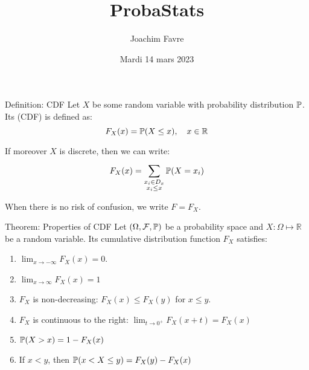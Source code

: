 \documentclass[a4paper]{article}
\title{ProbaStats}
\author{Joachim Favre}
\date{Mardi 14 mars 2023}
\begin{document}
\maketitle


\begin{parag}{Definition: CDF}
    Let $X$ be some random variable with probability distribution $\mathbb{P}$. Its  (CDF) is defined as: 
    \[F_X\left(x\right) = \prob\left(X \leq x\right), \mathspace x \in \mathbb{R}\]
    
    If moreover $X$ is discrete, then we can write: 
    \[F_X\left(x\right) = \sum_{\substack{x_i \in D_x \\ x_i \leq x}}^{} \prob\left(X = x_i\right)\]
    
    When there is no risk of confusion, we write $F = F_X$.
\end{parag}

\begin{parag}{Theorem: Properties of CDF}
    Let $\left(\Omega, \mathcal{F}, \prob\right)$ be a probability space and $X: \Omega \mapsto \mathbb{R}$ be a random variable. Its cumulative distribution function $F_X$ satisfies:
    \begin{enumerate}
        \item $\lim_{x \to -\infty} F_X\left(x\right) = 0$.
        \item $\lim_{x \to \infty} F_X\left(x\right) = 1$
        \item $F_X$ is non-decreasing: $F_X\left(x\right) \leq F_X\left(y\right)$ for $x \leq y$.
        \item $F_X$ is continuous to the right: $\lim_{t \to 0^+} F_X\left(x+t\right) = F_X\left(x\right)$
        \item $\prob\left(X > x\right) = 1 - F_X\left(x\right)$
        \item If $x < y$, then $\prob\left(x < X \leq y\right) = F_X\left(y\right) - F_X\left(x\right)$
    \end{enumerate}
\end{parag}
\end{document}
